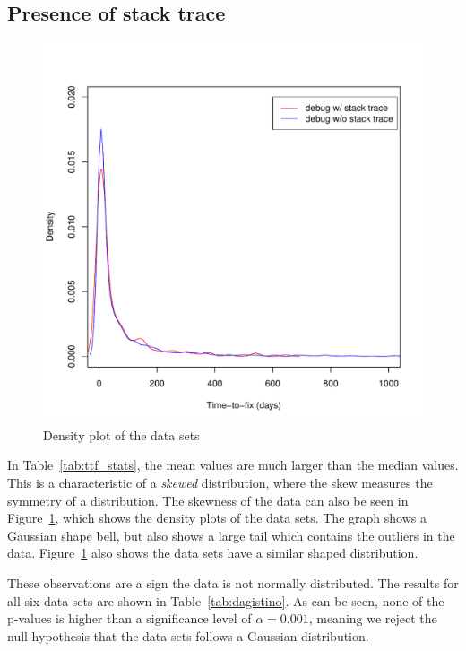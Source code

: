 \subsection{Presence of stack trace} %
\label{sub:norm:presence_of_stack_trace}
\begin{figure}[!ht]
	\centering
		\includegraphics[width=1\textwidth]{img/ttf_with_without_stacktrace_density.pdf}
	\caption{Density plot of the data sets}
	\label{fig:ttf_density_plot}
\end{figure}

In Table~\ref{tab:ttf_stats}, the mean values are much larger than the median values. This is a characteristic of a \emph{skewed} distribution, where the skew measures the symmetry of a distribution. The skewness of the data can also be seen in Figure~\ref{fig:ttf_density_plot}, which shows the density plots of the data sets. The graph shows a Gaussian shape bell, but also shows a large tail which contains the outliers in the data. Figure~\ref{fig:ttf_density_plot} also shows the data sets have a similar shaped distribution.

These observations are a sign the data is not normally distributed. The results for all six data sets are shown in Table~\ref{tab:dagistino}. As can be seen, none of the p-values is higher than a significance level of $\alpha = 0.001$, meaning we reject the null hypothesis that the data sets follows a Gaussian distribution. 

